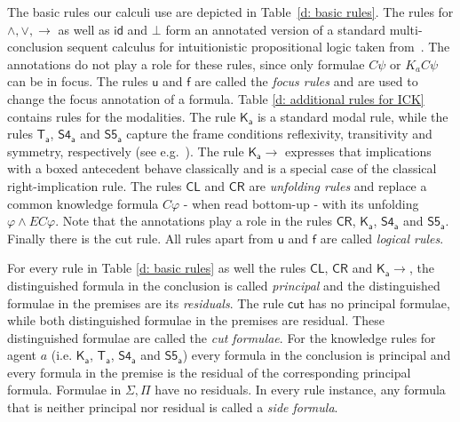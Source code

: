 \documentclass{myifcolog}
\newcommand\C {C}
\newcommand{\K}{K}
\newcommand{\agi}{a}
\newcommand{\E}{E}
\numberwithin{theorem}{section}
\begin{document}
The basic rules our calculi use are depicted in Table~\ref{d: basic rules}. The rules for $\wedge, \vee, \rightarrow$ as well as $\mathsf{id}$ and $\bot$ form an annotated version of a standard multi-conclusion sequent calculus for intuitionistic propositional logic taken from~\cite{Negri_2001}. The annotations do not play a role for these rules, since only formulae $\C \psi$ or $\K_\agi \C \psi$ can be in focus. The rules $\mathsf{u}$ and $\mathsf{f}$ are called the \emph{focus rules} and are used to change the focus annotation of a formula. Table \ref{d: additional rules for ICK} contains rules for the modalities. The rule $\mathsf{\K_\agi}$ is a standard modal rule, while the rules $\mathsf{T_\agi}$, $\mathsf{S4_\agi}$ and $\mathsf{S5_\agi}$ capture the frame conditions reflexivity, transitivity and symmetry, respectively (see e.g.~\cite{rooduijn_analytic_2022}). The rule $\mathsf{\K_\agi {\rightarrow}}$ expresses that implications with a boxed antecedent behave classically and is a special case of the classical right-implication rule. The rules $ \mathsf{\C L}$ and $ \mathsf{\C R}$ are \emph{unfolding rules} and replace a common knowledge formula $\C \varphi$ - when read bottom-up - with its unfolding $\varphi \wedge \E \C \varphi$. Note that the annotations play a role in the rules $ \mathsf{\C R}$, $\mathsf{\K_\agi}$, $\mathsf{S4_\agi}$ and $\mathsf{S5_\agi}$. Finally there is the cut rule. All rules apart from $\mathsf{u}$ and $\mathsf{f}$ are called \emph{logical rules}.

For every rule in Table \ref{d: basic rules} as well the rules $\mathsf{CL}$, $\mathsf{CR}$ and $\mathsf{\K_\agi{\rightarrow}}$, the distinguished formula in the conclusion is called \emph{principal} and the distinguished formulae in the premises are its \emph{residuals}. The rule $\mathsf{cut}$ has no principal formulae, while both distinguished formulae in the premises are residual. These distinguished formulae are called the \emph{cut formulae}. For the knowledge rules for agent $\agi$ (i.e. $\mathsf{\K_\agi}$, $\mathsf{T_\agi}$, $\mathsf{S4_\agi}$ and $\mathsf{S5_\agi}$) every formula in the conclusion is principal and every formula in the premise is the residual of the corresponding principal formula. Formulae in $\Sigma, \Pi$ have no residuals. In every rule instance, any formula that is neither principal nor residual is called a \emph{side formula}.
\end{document}
